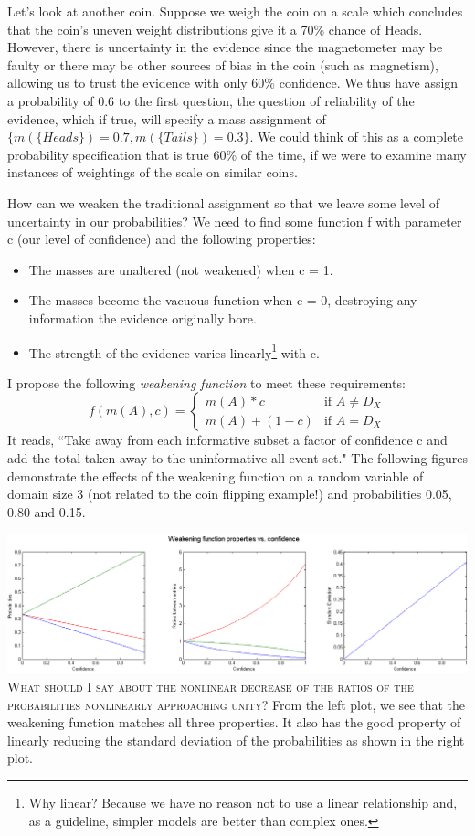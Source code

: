 \documentclass[letterpaper]{article}
\begin{document}
Let's look at another coin.  Suppose we weigh the coin on a scale which concludes that the coin's uneven weight distributions give it a 70\% chance of Heads.  However, there is uncertainty in the evidence since the magnetometer may be faulty or there may be other sources of bias in the coin (such as magnetism), allowing us to trust the evidence with only 60\% confidence.  We thus have assign a probability of 0.6 to the first question, the question of reliability of the evidence, which if true, will specify a mass assignment of $\{ m(\{Heads\})=0.7, m(\{Tails\})=0.3 \}$.  We could think of this as a complete probability specification that is true 60\% of the time, if we were to examine many instances of weightings of the scale on similar coins.

How can we weaken the traditional assignment so that we leave some level of uncertainty in our probabilities?  We need to find some function f with parameter c (our level of confidence) and the following properties:
\begin{itemize}
\item The masses are unaltered (not weakened) when c = 1.
\item The masses become the vacuous function when c = 0, destroying any information the evidence originally bore.
\item The strength of the evidence varies linearly\footnote{Why linear? Because we have no reason not to use a linear relationship and, as a guideline, simpler models are better than complex ones.} with c. %
\end{itemize}
I propose the following \textit{weakening function} to meet these requirements:
\[ f(m(A),c) = \begin{cases}
	m(A)*c &\mbox{if } A \neq D_X\\
	m(A)+(1-c) &\mbox{if } A = D_X \end{cases}
\]
It reads, ``Take away from each informative subset a factor of confidence c and add the total taken away to the uninformative all-event-set." The following figures demonstrate the effects of the weakening function on a random variable of domain size 3 (not related to the coin flipping example!) and probabilities 0.05, 0.80 and 0.15.

\includegraphics[width=\linewidth]{WeakeningFunctionExamplePlots.png}
\textsc{What should I say about the nonlinear decrease of the ratios of the probabilities nonlinearly approaching unity?}
From the left plot, we see that the weakening function matches all three properties.  It also has the good property of linearly reducing the standard deviation of the probabilities as shown in the right plot.
\end{document}
